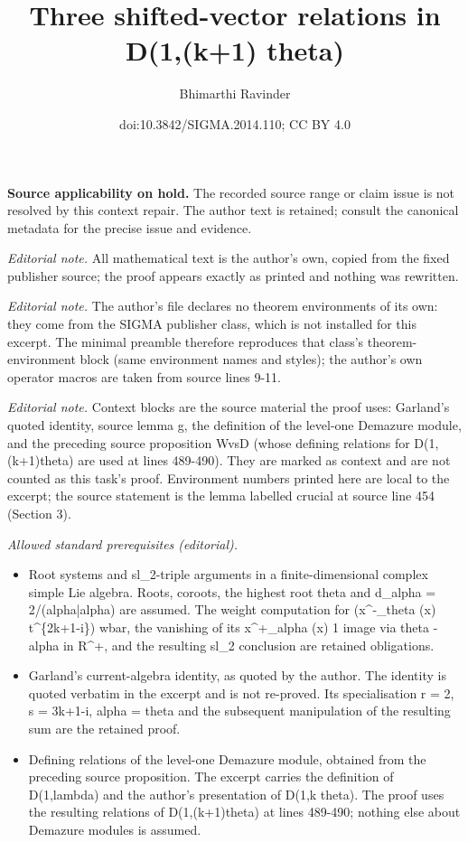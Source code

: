 \documentclass[10pt,a4paper]{amsart}
\title{Three shifted-vector relations in D(1,(k+1) theta)}
\author{Bhimarthi Ravinder}
\date{doi:10.3842/SIGMA.2014.110; CC BY 4.0}
\begin{document}
\maketitle
\par\medskip\noindent\textbf{Source applicability on hold.} The recorded source range or claim issue is not resolved by this context repair. The author text is retained; consult the canonical metadata for the precise issue and evidence.\par\medskip

\noindent\textit{Editorial note.} All mathematical text is the author's own, copied from the fixed publisher source; the proof appears exactly as printed and nothing was rewritten.\par\medskip
\noindent\textit{Editorial note.} The author's file declares no theorem environments of its own: they come from the SIGMA publisher class, which is not installed for this excerpt. The minimal preamble therefore reproduces that class's theorem-environment block (same environment names and styles); the author's own operator macros are taken from source lines 9-11.\par\medskip
\noindent\textit{Editorial note.} Context blocks are the source material the proof uses: Garland's quoted identity, source lemma g, the definition of the level-one Demazure module, and the preceding source proposition WvsD (whose defining relations for D(1,(k+1)theta) are used at lines 489-490). They are marked as context and are not counted as this task's proof. Environment numbers printed here are local to the excerpt; the source statement is the lemma labelled crucial at source line 454 (Section 3).\par\medskip
\noindent\textit{Allowed standard prerequisites (editorial).}\begin{itemize}
\item Root systems and sl\_2-triple arguments in a finite-dimensional complex simple Lie algebra. Roots, coroots, the highest root theta and d\_alpha = 2/(alpha|alpha) are assumed. The weight computation for (x\textasciicircum{}-\_theta (x) t\textasciicircum{}\{2k+1-i\}) wbar, the vanishing of its x\textasciicircum{}+\_alpha (x) 1 image via theta - alpha in R\textasciicircum{}+, and the resulting sl\_2 conclusion are retained obligations.
\item Garland's current-algebra identity, as quoted by the author. The identity is quoted verbatim in the excerpt and is not re-proved. Its specialisation r = 2, s = 3k+1-i, alpha = theta and the subsequent manipulation of the resulting sum are the retained proof.
\item Defining relations of the level-one Demazure module, obtained from the preceding source proposition. The excerpt carries the definition of D(1,lambda) and the author's presentation of D(1,k theta). The proof uses the resulting relations of D(1,(k+1)theta) at lines 489-490; nothing else about Demazure modules is assumed.
\end{itemize}\medskip
\end{document}
